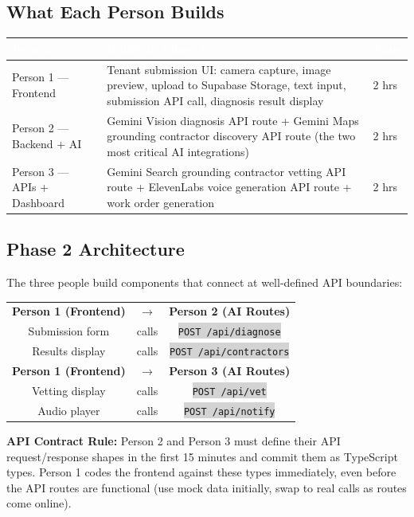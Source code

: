 \documentclass[11pt, a4paper]{article}
\newcommand{\code}[1]{\texttt{\small\colorbox{lightgray}{#1}}}
\begin{document}
\subsection{What Each Person Builds}

\begin{tabularx}{\textwidth}{|>{\columncolor{lightblue}}l|X|l|}
\hline
\rowcolor{primary}
\textcolor{white}{\textbf{Person}} & \textcolor{white}{\textbf{Builds in Phase 2}} & \textcolor{white}{\textbf{Time}} \\
\hline
Person 1 --- Frontend & Tenant submission UI: camera capture, image preview, upload to Supabase Storage, text input, submission API call, diagnosis result display & 2 hrs \\
\hline
Person 2 --- Backend + AI & Gemini Vision diagnosis API route + Gemini Maps grounding contractor discovery API route (the two most critical AI integrations) & 2 hrs \\
\hline
Person 3 --- APIs + Dashboard & Gemini Search grounding contractor vetting API route + ElevenLabs voice generation API route + work order generation & 2 hrs \\
\hline
\end{tabularx}

\subsection{Phase 2 Architecture}

The three people build components that connect at well-defined API boundaries:

\begin{center}
\begin{tabularx}{0.9\textwidth}{ccc}
\textbf{Person 1 (Frontend)} & $\longrightarrow$ & \textbf{Person 2 (AI Routes)} \\
Submission form & calls & \code{POST /api/diagnose} \\
Results display & calls & \code{POST /api/contractors} \\[6pt]
\textbf{Person 1 (Frontend)} & $\longrightarrow$ & \textbf{Person 3 (AI Routes)} \\
Vetting display & calls & \code{POST /api/vet} \\
Audio player & calls & \code{POST /api/notify} \\
\end{tabularx}
\end{center}

\begin{warningbox}
\textbf{API Contract Rule:} Person 2 and Person 3 must define their API request/response shapes in the first 15 minutes and commit them as TypeScript types. Person 1 codes the frontend against these types immediately, even before the API routes are functional (use mock data initially, swap to real calls as routes come online).
\end{warningbox}
\end{document}
